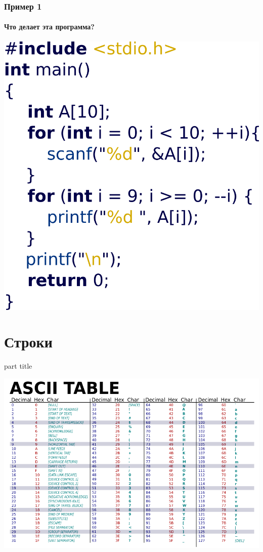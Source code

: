 \documentclass[14pt,pdf,hyperref={unicode}]{beamer}
\begin{document}
\begin{frame}[fragile]
\frametitle{Пример 1} 
\framesubtitle{Что делает эта программа?}
\begin{center}
\includegraphics[width=0.52\linewidth]{images/example3.png}
\end{center}
\end{frame}








\section{Строки}
\begin{frame}
\begin{center}
\begin{beamercolorbox}[sep=8pt,center]{part
title}
\insertsection
\end{beamercolorbox}
\end{center}
\end{frame}


\begin{frame}[fragile]
\begin{center}
\includegraphics[width=1.02\linewidth]{images/ascii.png}
\end{center}
\end{frame}
\end{document}
